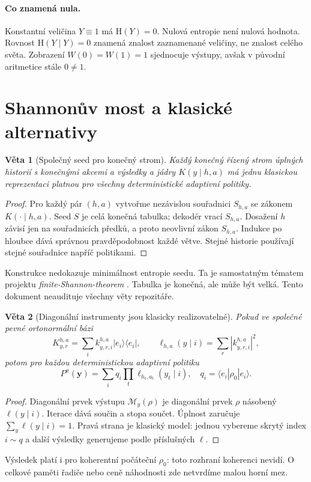 \documentclass[11pt,a4paper]{article}
\newtheorem{theorem}{Věta}
\newcommand{\HH}{\mathrm H}
\begin{document}
\paragraph{Co znamená nula.}
Konstantní veličina $Y\equiv1$ má $\HH(Y)=0$. Nulová entropie není nulová hodnota. Rovnost $\HH(Y\mid Y)=0$ znamená znalost zaznamenané veličiny, ne znalost celého světa.
Zobrazení $W(0)=W(1)=1$ sjednocuje výstupy, avšak v původní aritmetice stále $0\ne1$.

\newpage
\section{Shannonův most a klasické alternativy}
\begin{theorem}[Společný seed pro konečný strom]
Každý konečný řízený strom úplných historií s konečnými akcemi a výsledky a jádry $K(y\mid h,a)$ má jednu klasickou reprezentaci platnou pro všechny deterministické adaptivní politiky.
\end{theorem}
\begin{proof}
Pro každý pár $(h,a)$ vytvořme nezávislou souřadnici $S_{h,a}$ se zákonem $K(\cdot\mid h,a)$. Seed $S$ je celá konečná tabulka; dekodér vrací $S_{h,a}$. Dosažení $h$ závisí jen na souřadnicích předků, a proto neovlivní zákon $S_{h,a}$. Indukce po hloubce dává správnou pravděpodobnost každé větve. Stejné historie používají stejné souřadnice napříč politikami.
\end{proof}
Konstrukce nedokazuje minimálnost entropie seedu. Ta je samostatným tématem projektu \emph{finite-Shannon-theorem} \cite{repo}. Tabulka je konečná, ale může být velká. Tento dokument neaudituje všechny věty repozitáře.

\begin{theorem}[Diagonální instrumenty jsou klasicky realizovatelné]
Pokud ve společné pevné ortonormální bázi
\[
K_{y,r}^{h,a}=\sum_i k_{y,r,i}^{h,a}|e_i\rangle\langle e_i|,
\qquad
\ell_{h,a}(y\mid i)=\sum_r|k_{y,r,i}^{h,a}|^2,
\]
potom pro každou deterministickou adaptivní politiku
\[
P^\pi(\boldsymbol y)=\sum_iq_i\prod_t\ell_{h_t,a_t}(y_t\mid i),
\quad q_i=\langle e_i|\rho_0|e_i\rangle.
\]
\end{theorem}
\begin{proof}
Diagonální prvek výstupu $\mathcal M_y(\rho)$ je diagonální prvek $\rho$ násobený $\ell(y\mid i)$. Iterace dává součin a stopa součet.
Úplnost zaručuje $\sum_y\ell(y\mid i)=1$.
Pravá strana je klasický model: jednou vybereme skrytý index $i\sim q$ a další výsledky generujeme podle příslušných $\ell$.
\end{proof}
Výsledek platí i pro koherentní počáteční $\rho_0$: toto rozhraní koherenci nevidí. O celkové paměti řadiče nebo ceně náhodnosti zde netvrdíme malou horní mez.
\end{document}
